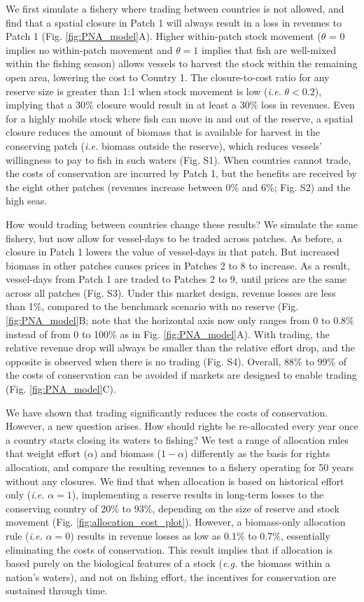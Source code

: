 \documentclass[12pt]{article}
\begin{document}
We first simulate a fishery where trading between countries is not allowed, and find that a spatial closure in Patch 1 will always result in a loss in revenues to Patch 1 (Fig. \ref{fig:PNA_model}A). Higher within-patch stock movement ($\theta$ = 0 implies no within-patch movement and $\theta = 1$ implies that fish are well-mixed within the fishing season) allows vessels to harvest the stock within the remaining open area, lowering the cost to Country 1. The closure-to-cost ratio for any reserve size is greater than 1:1 when stock movement is low (\emph{i.e.} $\theta < 0.2$), implying that a 30\% closure would result in at least a 30\% loss in revenues. Even for a highly mobile stock where fish can move in and out of the reserve, a spatial closure reduces the amount of biomass that is available for harvest in the conserving patch (\emph{i.e.} biomass outside the reserve), which reduces vessels' willingness to pay to fish in such waters (Fig. S1). When countries cannot trade, the costs of conservation are incurred by Patch 1, but the benefits are received by the eight other patches (revenues increase between 0\% and 6\%; Fig. S2) and the high seas.

How would trading between countries change these results? We simulate the same fishery, but now allow for vessel-days to be traded across patches. As before, a closure in Patch 1 lowers the value of vessel-days in that patch. But increased biomass in other patches causes prices in Patches 2 to 8 to increase. As a result, vessel-days from Patch 1 are traded to Patches 2 to 9, until prices are the same across all patches (Fig. S3). Under this market design, revenue losses are less than 1\%, compared to the benchmark scenario with no reserve (Fig. \ref{fig:PNA_model}B; note that the horizontal axis now only ranges from 0 to 0.8\% instead of from 0 to 100\% as in Fig. \ref{fig:PNA_model}A). With trading, the relative revenue drop will always be smaller than the relative effort drop, and the opposite is observed when there is no trading (Fig. S4). Overall, 88\% to 99\% of the costs of conservation can be avoided if markets are designed to enable trading (Fig. \ref{fig:PNA_model}C).

We have shown that trading significantly reduces the costs of conservation. However, a new question arises. How should rights be re-allocated every year once a country starts closing its waters to fishing? We test a range of allocation rules that weight effort ($\alpha$) and biomass ($1 - \alpha$) differently as the basis for rights allocation, and compare the resulting revenues to a fishery operating for 50 years without any closures. We find that when allocation is based on historical effort only (\emph{i.e.} $\alpha = 1$), implementing a reserve results in long-term losses to the conserving country of 20\% to 93\%, depending on the size of reserve and stock movement (Fig. \ref{fig:allocation_cost_plot}). However, a biomass-only allocation rule (\emph{i.e.} $\alpha = 0$) results in revenue losses as low as 0.1\% to 0.7\%, essentially eliminating the costs of conservation. This result implies that if allocation is based purely on the biological features of a stock (\emph{e.g.} the biomass within a nation's waters), and not on fishing effort, the incentives for conservation are sustained through time.
\end{document}
